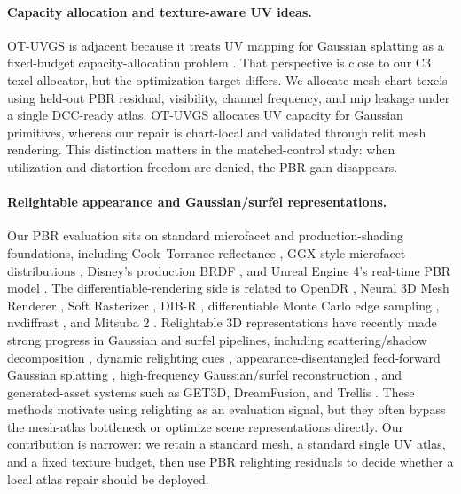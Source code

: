 \paragraph*{Capacity allocation and texture-aware UV ideas.}
OT-UVGS is adjacent because it treats UV mapping for Gaussian splatting as a fixed-budget capacity-allocation problem \cite{kim2026_ot_uvgs_revisiting_uv}. That perspective is close to our C3 texel allocator, but the optimization target differs. We allocate mesh-chart texels using held-out PBR residual, visibility, channel frequency, and mip leakage under a single DCC-ready atlas. OT-UVGS allocates UV capacity for Gaussian primitives, whereas our repair is chart-local and validated through relit mesh rendering. This distinction matters in the matched-control study: when utilization and distortion freedom are denied, the PBR gain disappears.

\paragraph*{Relightable appearance and Gaussian/surfel representations.}
Our PBR evaluation sits on standard microfacet and production-shading foundations, including Cook--Torrance reflectance \cite{cook1982_reflectance_model}, GGX-style microfacet distributions \cite{walter2007_microfacet_refraction}, Disney's production BRDF \cite{burley2012_disney_brdf}, and Unreal Engine 4's real-time PBR model \cite{karis2013_real_shading_ue4}. The differentiable-rendering side is related to OpenDR \cite{loper2014_opendr}, Neural 3D Mesh Renderer \cite{kato2018_neural_3d_mesh_renderer}, Soft Rasterizer \cite{liu2019_soft_rasterizer}, DIB-R \cite{chen2019_dibr}, differentiable Monte Carlo edge sampling \cite{li2018_differentiable_monte_carlo}, nvdiffrast \cite{laine2020_nvdiffrast_modular_primitives}, and Mitsuba 2 \cite{nimier_david2019_mitsuba2}. Relightable 3D representations have recently made strong progress in Gaussian and surfel pipelines, including scattering/shadow decomposition \cite{zheng2026_ssd_gs_scattering_shadow}, dynamic relighting cues \cite{kaleta2026_lumimotion_improving_gaussian_relighting}, appearance-disentangled feed-forward Gaussian splatting \cite{herau2026_spectralsplat_appearance_disentangled_feed}, high-frequency Gaussian/surfel reconstruction \cite{watanabe2026_neural_gabor_splatting_enhanced,dai2026_surfelsplat_learning_efficient_generalizable,gomez2026_blobs_spokes_high_fidelity}, and generated-asset systems such as GET3D, DreamFusion, and Trellis \cite{gao2022_get3d_generative_model,poole2023_dreamfusion_text_to_3d,xiang2024_trellis_structured_3d_latents}. These methods motivate using relighting as an evaluation signal, but they often bypass the mesh-atlas bottleneck or optimize scene representations directly. Our contribution is narrower: we retain a standard mesh, a standard single UV atlas, and a fixed texture budget, then use PBR relighting residuals to decide whether a local atlas repair should be deployed.
